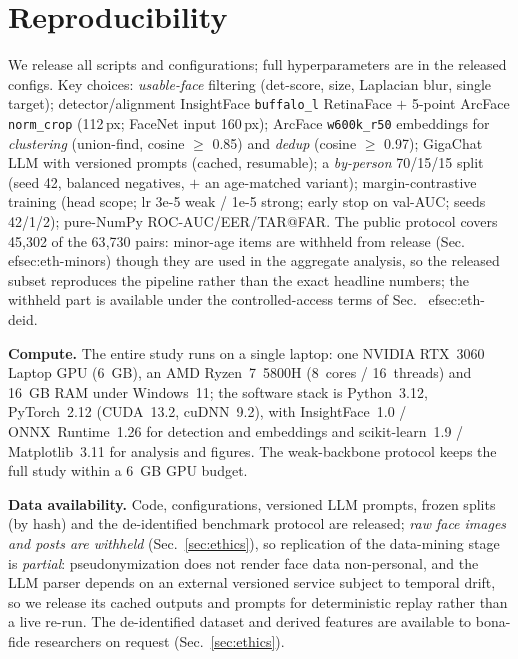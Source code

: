 \documentclass[journal]{IEEEtran}
\begin{document}
\section{Reproducibility}\label{sec:repro}
We release all scripts and configurations; full hyperparameters are in the released configs. Key choices: \emph{usable-face} filtering (det-score, size, Laplacian blur, single target); detector/alignment InsightFace \texttt{buffalo\_l} RetinaFace $+$ 5-point ArcFace \texttt{norm\_crop} (112\,px; FaceNet input 160\,px); ArcFace \texttt{w600k\_r50} embeddings for \emph{clustering} (union-find, cosine $\geq$ 0.85) and \emph{dedup} (cosine $\geq$ 0.97); GigaChat LLM with versioned prompts (cached, resumable); a \emph{by-person} 70/15/15 split (seed 42, balanced negatives, $+$ an age-matched variant); margin-contrastive training (head scope; lr 3e-5 weak / 1e-5 strong; early stop on val-AUC; seeds 42/1/2); pure-NumPy ROC-AUC/EER/TAR@FAR. The public protocol covers 45{,}302 of the 63{,}730 pairs: minor-age items are withheld from release (Sec.~
ef{sec:eth-minors}) though they are used in the aggregate analysis, so the released subset reproduces the pipeline rather than the exact headline numbers; the withheld part is available under the controlled-access terms of Sec.~
ef{sec:eth-deid}.

\textbf{Compute.} The entire study runs on a single laptop: one NVIDIA RTX~3060 Laptop GPU (6~GB), an AMD Ryzen~7~5800H (8~cores / 16~threads) and 16~GB RAM under Windows~11; the software stack is Python~3.12, PyTorch~2.12 (CUDA~13.2, cuDNN~9.2), with InsightFace~1.0 / ONNX~Runtime~1.26 for detection and embeddings and scikit-learn~1.9 / Matplotlib~3.11 for analysis and figures. The weak-backbone protocol keeps the full study within a 6~GB GPU budget.

\textbf{Data availability.} Code, configurations, versioned LLM prompts, frozen splits (by hash) and the de-identified benchmark protocol are released; \emph{raw face images and posts are withheld} (Sec.~\ref{sec:ethics}), so replication of the data-mining stage is \emph{partial}: pseudonymization does not render face data non-personal, and the LLM parser depends on an external versioned service subject to temporal drift, so we release its cached outputs and prompts for deterministic replay rather than a live re-run. The de-identified dataset and derived features are available to bona-fide researchers on request (Sec.~\ref{sec:ethics}).
\end{document}
